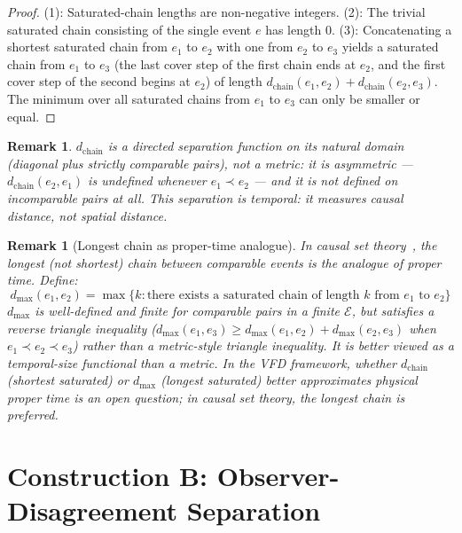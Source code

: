 \documentclass[12pt]{article}
\newtheorem{remark}[theorem]{Remark}
\newcommand{\Ecal}{\mathcal{E}}
\begin{document}
\begin{proof}
(1): Saturated-chain lengths are non-negative integers. (2): The trivial saturated chain consisting of the single event $e$ has length $0$. (3): Concatenating a shortest saturated chain from $e_1$ to $e_2$ with one from $e_2$ to $e_3$ yields a saturated chain from $e_1$ to $e_3$ (the last cover step of the first chain ends at $e_2$, and the first cover step of the second begins at $e_2$) of length $d_{\mathrm{chain}}(e_1, e_2) + d_{\mathrm{chain}}(e_2, e_3)$. The minimum over all saturated chains from $e_1$ to $e_3$ can only be smaller or equal.
\end{proof}

\begin{remark}
$d_{\mathrm{chain}}$ is a directed separation function on its natural domain (diagonal plus strictly comparable pairs), not a metric: it is asymmetric --- $d_{\mathrm{chain}}(e_2, e_1)$ is undefined whenever $e_1 \prec e_2$ --- and it is not defined on incomparable pairs at all. This separation is \textit{temporal}: it measures causal distance, not spatial distance.
\end{remark}

\begin{remark}[Longest chain as proper-time analogue]
In causal set theory~\citep{BombelliLeeMeyerSorkin1987,BrightwellGregory1991}, the longest (not shortest) chain between comparable events is the analogue of proper time. Define:
\begin{equation}
    d_{\max}(e_1, e_2) = \max\{k : \text{there exists a saturated chain of length } k \text{ from } e_1 \text{ to } e_2\}
\end{equation}
$d_{\max}$ is well-defined and finite for comparable pairs in a finite $\Ecal$, but satisfies a \emph{reverse} triangle inequality ($d_{\max}(e_1, e_3) \geq d_{\max}(e_1, e_2) + d_{\max}(e_2, e_3)$ when $e_1 \prec e_2 \prec e_3$) rather than a metric-style triangle inequality. It is better viewed as a temporal-size functional than a metric. In the VFD framework, whether $d_{\mathrm{chain}}$ (shortest saturated) or $d_{\max}$ (longest saturated) better approximates physical proper time is an open question; in causal set theory, the longest chain is preferred.
\end{remark}

\section{Construction B: Observer-Disagreement Separation}\label{sec:disagreement}
\end{document}
